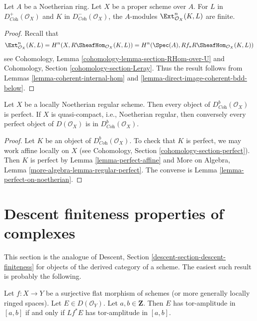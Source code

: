 \begin{lemma}
\label{lemma-ext-finite}
Let $A$ be a Noetherian ring. Let $X$ be a proper scheme over $A$.
For $L$ in
$D^+_{\textit{Coh}}(\mathcal{O}_X)$ and $K$ in
$D^-_{\textit{Coh}}(\mathcal{O}_X)$, the $A$-modules
$\Ext_{\mathcal{O}_X}^n(K, L)$ are finite.
\end{lemma}

\begin{proof}
Recall that
$$
\Ext_{\mathcal{O}_X}^n(K, L) =
H^n(X, R\SheafHom_{\mathcal{O}_X}(K, L)) =
H^n(\Spec(A), Rf_*R\SheafHom_{\mathcal{O}_X}(K, L))
$$
see Cohomology, Lemma \ref{cohomology-lemma-section-RHom-over-U}
and Cohomology, Section \ref{cohomology-section-Leray}.
Thus the result follows from
Lemmas \ref{lemma-coherent-internal-hom} and
\ref{lemma-direct-image-coherent-bdd-below}.
\end{proof}

\begin{lemma}
\label{lemma-perfect-on-regular}
Let $X$ be a locally Noetherian regular scheme. Then
every object of $D^b_{\textit{Coh}}(\mathcal{O}_X)$ is perfect.
If $X$ is quasi-compact, i.e., Noetherian regular,
then conversely every perfect object of
$D(\mathcal{O}_X)$ is in $D^b_{\textit{Coh}}(\mathcal{O}_X)$.
\end{lemma}

\begin{proof}
Let $K$ be an object of $D^b_{\textit{Coh}}(\mathcal{O}_X)$.
To check that $K$ is perfect, we may work affine locally on $X$
(see Cohomology, Section \ref{cohomology-section-perfect}).
Then $K$ is perfect by Lemma \ref{lemma-perfect-affine} and
More on Algebra, Lemma \ref{more-algebra-lemma-regular-perfect}.
The converse is Lemma \ref{lemma-perfect-on-noetherian}.
\end{proof}




\section{Descent finiteness properties of complexes}
\label{section-descent-finiteness}

\noindent
This section is the analogue of
Descent, Section \ref{descent-section-descent-finiteness}
for objects of the derived category of a scheme.
The easiest such result is probably the following.

\begin{lemma}
\label{lemma-tor-amplitude-descends}
Let $f : X \to Y$ be a surjective flat morphism of schemes
(or more generally locally ringed spaces).
Let $E \in D(\mathcal{O}_Y)$. Let $a, b \in \mathbf{Z}$.
Then $E$ has tor-amplitude in $[a, b]$ if and only if
$Lf^*E$ has tor-amplitude in $[a, b]$.
\end{lemma}

